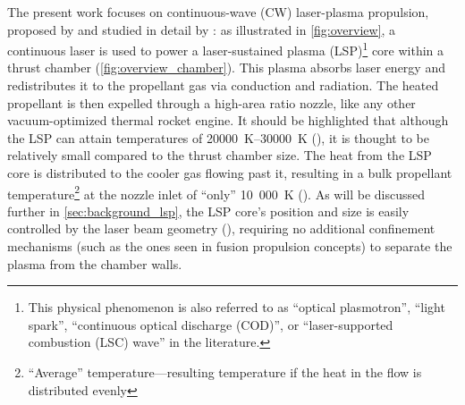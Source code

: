        The present work focuses on continuous-wave (CW) laser-plasma propulsion, proposed by \textcite{noredApplicationHighPower1976} and studied in detail by \textcite{keeferLaserSustainedPlasmas1989}: as illustrated in \autoref{fig:overview}, a continuous laser is used to power a laser-sustained plasma (LSP)\footnote{This physical phenomenon is also referred to as ``optical plasmotron'', ``light spark'', ``continuous optical discharge (COD)'', or ``laser-supported combustion (LSC) wave'' in the literature.} core within a thrust chamber (\autoref{fig:overview_chamber}). This plasma absorbs laser energy and redistributes it to the propellant gas via conduction and radiation. The heated propellant is then expelled through a high-area ratio nozzle, like any other vacuum-optimized thermal rocket engine. It should be highlighted that although the LSP can attain temperatures of \qtyrange{20000}{30000}{K} (\textcite{noredApplicationHighPower1976}), it is thought to be relatively small compared to the thrust chamber size. The heat from the LSP core is distributed to the cooler gas flowing past it, resulting in a bulk propellant temperature\footnote{``Average'' temperature---resulting temperature if the heat in the flow is distributed evenly} at the nozzle inlet of ``only'' 10~000~K (\textcite{duplayDesignRapidTransit2022}). As will be discussed further in \autoref{sec:background_lsp}, the LSP core's position and size is easily controlled by the laser beam geometry (\textcite{keeferLaserSustainedPlasmas1989}), requiring no additional confinement mechanisms (such as the ones seen in fusion propulsion concepts) to separate the plasma from the chamber walls. 
        
